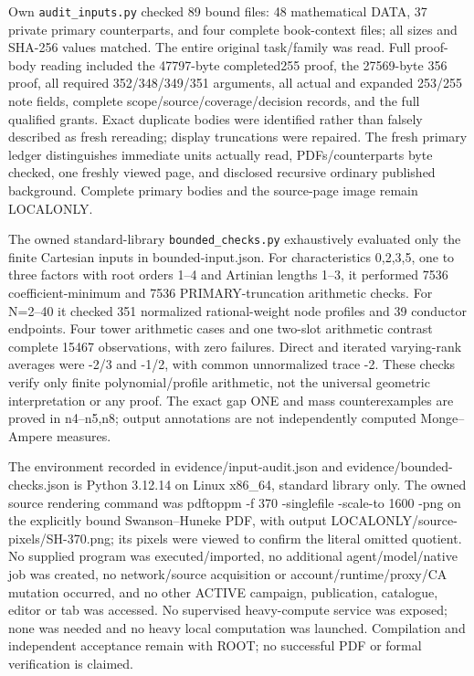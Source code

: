 \documentclass[11pt]{article}
\begin{document}
Own \texttt{audit\_inputs.py} checked 89 bound files: 48 mathematical DATA, 37 private primary counterparts, and four complete book-context files; all sizes and SHA-256 values matched. The entire original task/family was read. Full proof-body reading included the 47797-byte completed255 proof, the 27569-byte 356 proof, all required 352/348/349/351 arguments, all actual and expanded 253/255 note fields, complete scope/source/coverage/decision records, and the full qualified grants. Exact duplicate bodies were identified rather than falsely described as fresh rereading; display truncations were repaired. The fresh primary ledger distinguishes immediate units actually read, PDFs/counterparts byte checked, one freshly viewed page, and disclosed recursive ordinary published background. Complete primary bodies and the source-page image remain LOCALONLY.

The owned standard-library \texttt{bounded\_checks.py} exhaustively evaluated only the finite Cartesian inputs in bounded-input.json. For characteristics 0,2,3,5, one to three factors with root orders 1--4 and Artinian lengths 1--3, it performed 7536 coefficient-minimum and 7536 PRIMARY-truncation arithmetic checks. For N=2--40 it checked 351 normalized rational-weight node profiles and 39 conductor endpoints. Four tower arithmetic cases and one two-slot arithmetic contrast complete 15467 observations, with zero failures. Direct and iterated varying-rank averages were -2/3 and -1/2, with common unnormalized trace -2. These checks verify only finite polynomial/profile arithmetic, not the universal geometric interpretation or any proof. The exact gap ONE and mass counterexamples are proved in n4--n5,n8; output annotations are not independently computed Monge--Ampere measures.

The environment recorded in evidence/input-audit.json and evidence/bounded-checks.json is Python 3.12.14 on Linux x86_64, standard library only. The owned source rendering command was pdftoppm -f 370 -singlefile -scale-to 1600 -png on the explicitly bound Swanson--Huneke PDF, with output LOCALONLY/source-pixels/SH-370.png; its pixels were viewed to confirm the literal omitted quotient. No supplied program was executed/imported, no additional agent/model/native job was created, no network/source acquisition or account/runtime/proxy/CA mutation occurred, and no other ACTIVE campaign, publication, catalogue, editor or tab was accessed. No supervised heavy-compute service was exposed; none was needed and no heavy local computation was launched. Compilation and independent acceptance remain with ROOT; no successful PDF or formal verification is claimed.
\end{document}
